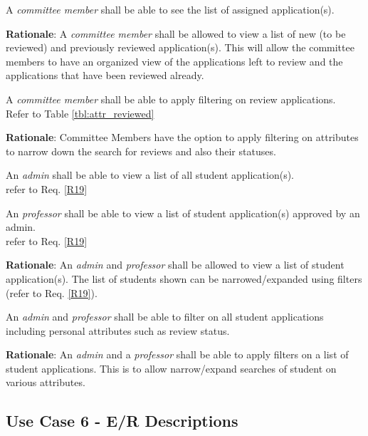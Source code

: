 \documentclass[fontsize=12pt,paper=letter,twoside]{scrartcl}
\begin{document}
\genreq
{A \emph{committee member} shall be able to see the list of assigned application(s).\\}
{}
\label{R15}

\smallskip
\noindent \textbf{Rationale}: A \emph{committee member} shall be allowed to view a list of new (to be reviewed) and previously reviewed application(s). This will allow the committee members to have an organized view of the applications left to review and the applications that have been reviewed already.

\rdescription
{A \emph{committee member} shall be able to apply filtering on review applications.\\}
{Refer to Table \ref{tbl:attr_reviewed}}
\label{R16}

\smallskip
\noindent \textbf{Rationale}: Committee Members have the option to apply filtering on attributes to narrow down the search for reviews and also their statuses.

\rdescription
{An \emph{admin} shall be able to view a list of all student application(s).\\}
{refer to Req. \ref{R19}}
\label{R17}

\rdescription
{An \emph{professor} shall be able to view a list of student application(s) approved by an admin.\\}
{refer to Req. \ref{R19}}
\label{R18}

\smallskip
\noindent \textbf{Rationale}: An \emph{admin} and \emph{professor} shall be allowed to view a list of student application(s). The list of students shown can be narrowed/expanded using filters (refer to Req. \ref{R19}).

\genreq
{An \emph{admin} and \emph{professor} shall be able to filter on all student applications including personal attributes such as review status.\\}
{}
\label{R19}

\smallskip
\noindent \textbf{Rationale}: An \emph{admin} and a \emph{professor} shall be able to apply filters on a list of student applications. This is to allow narrow/expand searches of student on various attributes.

\subsection{Use Case 6 - E/R Descriptions}
\end{document}
